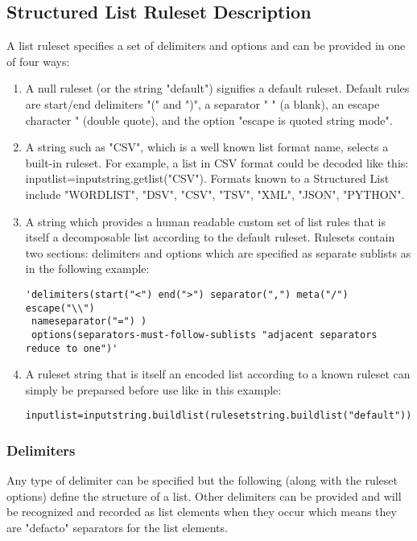 \subsection{Structured List Ruleset Description}

A list ruleset specifies a set of delimiters and options and can be provided in one of four ways:
\begin{enumerate}
\item A null ruleset (or the string "default") signifies a default ruleset. Default rules are start/end delimiters "(" and ")", a separator " " (a blank), an escape character " (double quote), and the option "escape is quoted string mode".

\item A string such as "CSV", which is a well known list format name, selects a built-in ruleset. For example, a list in CSV format could be decoded like this: inputlist=inputstring.getlist("CSV"). Formats known to a Structured List include "WORDLIST", "DSV", "CSV", "TSV", "XML", "JSON", "PYTHON".

\item A string which provides a human readable custom set of list rules that is itself a decomposable list according to the default ruleset. Rulesets contain two sections: delimiters and options which are specified as separate sublists as in the following example: 

\begin{verbatim}
'delimiters(start("<") end(">") separator(",") meta("/") escape("\\")
 nameseparator("=") ) 
 options(separators-must-follow-sublists "adjacent separators reduce to one")'
\end{verbatim}
\item A ruleset string that is itself an encoded list according to a
  known ruleset can simply be preparsed before use like in this
  example: 
\begin{verbatim}
inputlist=inputstring.buildlist(rulesetstring.buildlist("default"))
\end{verbatim}
\end{enumerate}

\subsubsection{Delimiters}

Any type of delimiter can be specified but the following (along with the ruleset options) define the structure of a list. Other delimiters can be provided and will be recognized and recorded as list elements when they occur which means they are "defacto" separators for the list elements.

